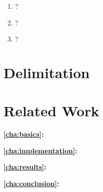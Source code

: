 \begin{enumerate}[label=\textit{\textbf{Question \#\arabic*}}, leftmargin=4.25cm, resume]
    \item \label{FF1} \glqq ?\grqq{}
    \item \label{FF2} \glqq ?\grqq{}
    \item \label{FF3} \glqq ?\grqq{}
\end{enumerate}

\lipsum[1]

\section{Delimitation}
\label{sec:delimitation}

\lipsum[2]

\section{Related Work}
\label{cha:relatedwork}

\lipsum[2]

\clearpage

\textbf{\autoref{cha:basics}: }\\
\lipsum[2]

\textbf{\autoref{cha:implementation}: }\\
\lipsum[2]

\textbf{\autoref{cha:results}: }\\
\lipsum[2]

\textbf{\autoref{cha:conclusion}: }\\
\lipsum[2]
